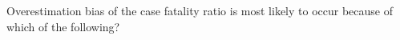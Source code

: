 Overestimation bias of the case fatality ratio is most likely to occur because of which of the following?

\begin{MultipleChoice}[itemname=II-5]
\end{MultipleChoice}

